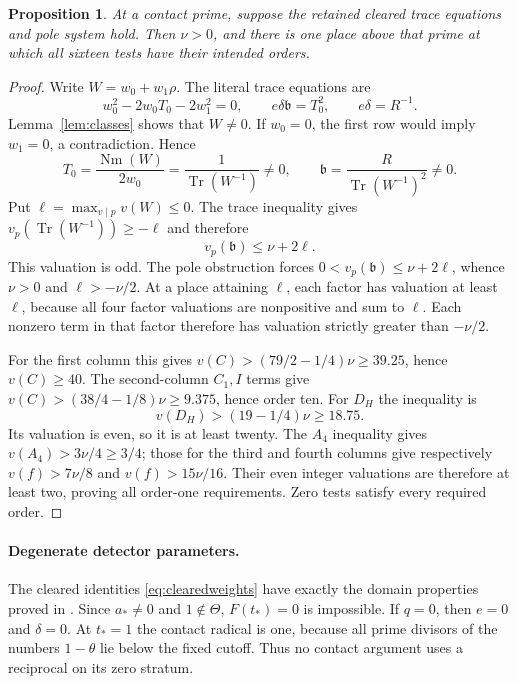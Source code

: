 \documentclass[11pt,a4paper]{article}
\newtheorem{proposition}[theorem]{Proposition}
\theoremstyle{remark}\newtheorem{remark}[theorem]{Remark}
\DeclareMathOperator{\Tr}{Tr}\DeclareMathOperator{\Nm}{Nm}
\begin{document}
\begin{proposition}\label{prop:extraction}
At a contact prime, suppose the retained cleared trace equations and
pole system hold. Then $\nu>0$, and there is one place above that
prime at which all sixteen tests have their intended orders.
\end{proposition}
\begin{proof}
Write $W=w_0+w_1\rho$. The literal trace equations are
\begin{equation}\label{eq:trace}
 w_0^2-2w_0T_0-2w_1^2=0,\qquad
 e\delta\mathfrak b=T_0^2,\qquad e\delta=R^{-1}.
\end{equation}
Lemma~\ref{lem:classes} shows that $W\ne0$. If $w_0=0$, the first
row would imply $w_1=0$, a contradiction. Hence
\[
 T_0=\frac{\Nm(W)}{2w_0}=\frac1{\Tr(W^{-1})}\ne0,
 \qquad \mathfrak b=\frac{R}{\Tr(W^{-1})^2}\ne0.
\]
Put $\ell=\max_{v\mid p}v(W)\le0$. The trace inequality gives
$v_p(\Tr(W^{-1}))\ge-\ell$ and therefore
\[
                v_p(\mathfrak b)\le\nu+2\ell.
\]
This valuation is odd. The pole obstruction forces
$0<v_p(\mathfrak b)\le\nu+2\ell$, whence $\nu>0$ and
$\ell>-\nu/2$. At a place attaining $\ell$, each factor has
valuation at least $\ell$, because all four factor valuations are
nonpositive and sum to $\ell$. Each nonzero term in that factor
therefore has valuation strictly greater than $-\nu/2$.

For the first column this gives
$v(C)>(79/2-1/4)\nu\ge39.25$, hence $v(C)\ge40$.
The second-column $C_1,I$ terms give
$v(C)>(38/4-1/8)\nu\ge9.375$, hence order ten.
For $D_H$ the inequality is
\[
             v(D_H)>(19-1/4)\nu\ge18.75.
\]
Its valuation is even, so it is at least twenty.
The $A_4$ inequality gives $v(A_4)>3\nu/4\ge3/4$;
those for the third and fourth columns give respectively
$v(f)>7\nu/8$ and $v(f)>15\nu/16$.
Their even integer valuations are therefore at least two, proving
all order-one requirements. Zero tests satisfy every required order.
\end{proof}

\paragraph{Degenerate detector parameters.}
The cleared identities \eqref{eq:clearedweights} have exactly the domain
properties proved in \cite[Lemma 2.1]{Shared}. Since $a_*\ne0$ and
$1\notin\Theta$, $F(t_*)=0$ is impossible. If $q=0$, then $e=0$
and $\delta=0$. At $t_*=1$ the contact radical is one, because all
prime divisors of the numbers $1-\theta$ lie below the fixed cutoff.
Thus no contact argument uses a reciprocal on its zero stratum.
\end{document}
